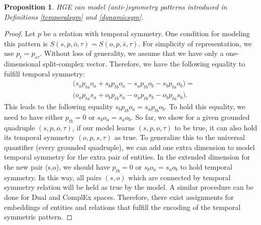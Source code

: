 \documentclass[letterpaper]{article} %
\newtheorem{proposition}{Proposition}
\begin{document}
 \begin{proposition}
HGE can model (anti-)symmetry patterns introduced in Definitions \ref{temporalsym} and \ref{dynamicsym}.
\label{th1:tempsym}
\end{proposition}
\begin{proof}
Let $p$ be a relation with temporal symmetry.
One condition for modeling this pattern is $S(s,p,\bar{o},\tau) =  S(o,p,\bar{s},\tau).$  For simplicity of representation, we use $p_t = p_{s\tau}.$
Without loss of generality, we assume that we have only a one-dimensional split-complex vector. Therefore, we have the following equality to fulfill temporal symmetry:
\begin{equation*}
\begin{split}
    &\big( s_a p_{ta} o_{a} + s_b p_{tb} o_{a} - s_a p_{tb} o_{b} - s_b p_{ta} o_{b}\big) = \\
    &\big( o_a p_{ta} s_{a} + o_b p_{tb} s_{a} - o_a p_{tb} s_{b} - o_b p_{ta} s_{b} \big).
\end{split}
\end{equation*}
This leads to the following equality $s_b p_{tb} o_{a} = s_a p_{tb} o_{b}.$
To hold this equality, we need to have either $p_{tb} = 0$ or $s_b o_{a} = s_a o_{b}$.
So far, we show for a given grounded quadruple $(s,p,o,\tau)$,
if our model learns $(s,p,o,\tau)$ to be true, it can also hold its temporal symmetry $(o,p,s,\tau)$ as true.
To generalize this to the universal quantifier (every grounded quadruple),
we can add one extra dimension to model temporal symmetry for the extra pair of entities. In the extended dimension for the new pair (s,o), we should have $p_{tb} = 0$ or $s_b o_{a} = s_a o_{b}$ to hold temporal symmetry. In this way, all pairs $(s,o)$ which are connected by temporal symmetry relation will be held as true by the model.
A similar procedure can be done for Dual and ComplEx spaces. Therefore, there exist assignments for embeddings of entities and relations that fulfill the encoding of the temporal symmetric pattern.
\end{proof}
\end{document}

